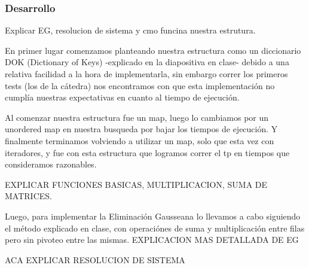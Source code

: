 \subsubsection*{Desarrollo}
Explicar EG, resolucion de sistema y cmo funcina nuestra estrutura.

\par En primer lugar comenzamos planteando nuestra estructura como un diccionario DOK (Dictionary of Keys) -explicado en la diapositiva en clase- debido a una relativa facilidad a la hora de implementarla, sin embargo correr los primeros tests (los de la cátedra) nos encontramos con que esta implementación no cumplía nuestras expectativas en cuanto al tiempo de ejecución.

\par Al comenzar nuestra estructura fue un map, luego lo cambiamos por un unordered map en nuestra busqueda por bajar los tiempos de ejecución. Y finalmente terminamos volviendo a utilizar un map, solo que esta vez con iteradores, y fue con esta estructura que logramos correr el tp en tiempos que consideramos razonables.

\par EXPLICAR FUNCIONES BASICAS, MULTIPLICACION, SUMA DE MATRICES.

\par Luego, para implementar la Eliminación Gausseana lo llevamos a cabo siguiendo el método explicado en clase, con operaciónes de suma y multiplicación entre filas pero sin pivoteo entre las mismas.
EXPLICACION MAS DETALLADA DE EG

\par ACA EXPLICAR RESOLUCION DE SISTEMA 

